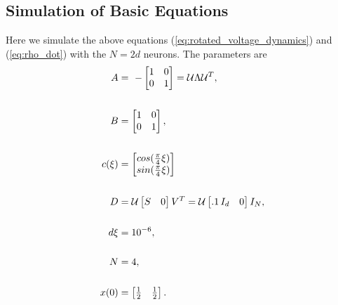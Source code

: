 \subsection{Simulation of Basic Equations}
Here we simulate the above equations (\ref{eq:rotated_voltage_dynamics}) and (\ref{eq:rho_dot}) with the $N = 2d$ neurons. The parameters are
\begin{align}
\label{eq:sim_I_params}
A
&=
\ -\begin{bmatrix}  
1 & 0 \\
0 & 1
\end{bmatrix} = \mathcal{U} \Lambda \mathcal{U}^T \notag,
\\
\notag
\\
B
&=
\begin{bmatrix}  
1 & 0 \\
0 & 1
\end{bmatrix}, \notag 
\\
\notag 
\\
c(\xi) 
&=
\begin{bmatrix} 
cos(\frac{\pi}{4} \xi)\\
sin(\frac{\pi}{4} \xi)
\end{bmatrix} 
\\
\notag
\\
D
&=
\mathcal{U} 
\begin{bmatrix}
S & 0
\end{bmatrix}
V^T
=
\mathcal{U} 
\begin{bmatrix}
.1 \, I_d & 0
\end{bmatrix}
I_N \notag,
\\
\notag 
\\
d\xi 
&= 
10^{-6}, \notag 
\\
\notag 
\\
N 
&= 
4,\notag 
\\
\notag 
\\
x(0) 
&= 
\begin{bmatrix} \frac{1}{2} & \frac{1}{2} \end{bmatrix}.\notag 
\end{align}

